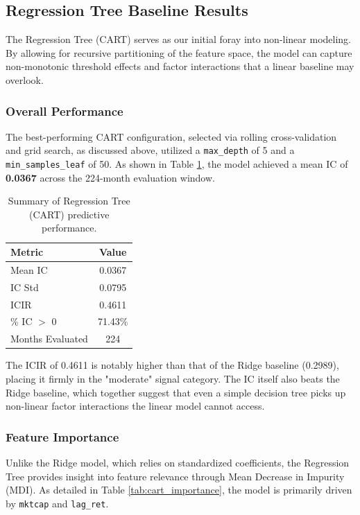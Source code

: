 \documentclass[11pt]{article}
\begin{document}
\subsection{Regression Tree Baseline Results}
The Regression Tree (CART) serves as our initial foray into non-linear modeling. By allowing for recursive partitioning of the feature space, the model can capture non-monotonic threshold effects and factor interactions that a linear baseline may overlook.

\subsubsection{Overall Performance}
The best-performing CART configuration, selected via rolling cross-validation and grid search, as discussed above, utilized a \texttt{max\_depth} of 5 and a \texttt{min\_samples\_leaf} of 50. As shown in Table \ref{tab:cart_results}, the model achieved a mean IC of \textbf{0.0367} across the 224-month evaluation window.

\begin{table}[H]
\centering
\begin{tabular}{lc}
\toprule
\textbf{Metric} & \textbf{Value} \\
\midrule
Mean IC & 0.0367 \\
IC Std & 0.0795 \\
ICIR & 0.4611 \\
\% IC $>$ 0 & 71.43\% \\
Months Evaluated & 224 \\
\bottomrule
\end{tabular}
\caption{Summary of Regression Tree (CART) predictive performance.}
\label{tab:cart_results}
\end{table}

The ICIR of 0.4611 is notably higher than that of the Ridge baseline (0.2989), placing it firmly in the "moderate" signal category. The IC itself also beats the Ridge baseline, which together suggest that even a simple decision tree picks up non-linear factor interactions the linear model cannot access.

\subsubsection{Feature Importance}
Unlike the Ridge model, which relies on standardized coefficients, the Regression Tree provides insight into feature relevance through Mean Decrease in Impurity (MDI). As detailed in Table \ref{tab:cart_importance}, the model is primarily driven by \texttt{mktcap} and \texttt{lag\_ret}.
\end{document}
